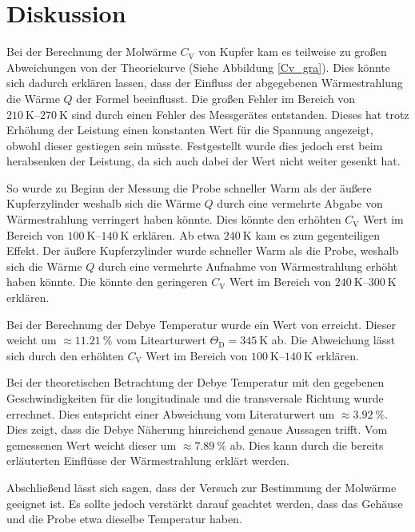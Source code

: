\section{Diskussion} %
\label{sec:diskussion}

Bei der Berechnung der Molwärme $C_\mathrm{V}$ von Kupfer kam es teilweise zu großen Abweichungen von der Theoriekurve (Siehe Abbildung \ref{Cv_gra}). 
Dies könnte sich dadurch erklären lassen, dass der Einfluss der abgegebenen Wärmestrahlung die Wärme $Q$ der Formel beeinflusst.
Die großen Fehler im Bereich von $\SIrange{210}{270}{\kelvin}$ sind durch einen Fehler des Messgerätes entstanden.
Dieses hat trotz Erhöhung der Leistung einen konstanten Wert für die Spannung angezeigt, obwohl dieser gestiegen sein müsste.
Festgestellt wurde dies jedoch erst beim herabsenken der Leistung, da sich auch dabei der Wert nicht weiter gesenkt hat.

So wurde zu Beginn der Messung die Probe schneller Warm als der äußere Kupferzylinder weshalb sich die Wärme $Q$ durch eine vermehrte Abgabe von Wärmestrahlung verringert haben könnte.
Dies könnte den erhöhten $C_\mathrm{V}$ Wert im Bereich von $\SIrange{100}{140}{\kelvin}$ erklären.
Ab etwa $\SI{240}{\kelvin}$ kam es zum gegenteiligen Effekt.
Der äußere Kupferzylinder wurde schneller Warm als die Probe, weshalb sich die Wärme $Q$ durch eine vermehrte Aufnahme von Wärmestrahlung erhöht haben könnte.
Die könnte den geringeren $C_\mathrm{V}$ Wert im Bereich von $\SIrange{240}{300}{\kelvin}$ erklären.

Bei der Berechnung der Debye Temperatur wurde ein Wert von  erreicht.
Dieser weicht um $\approx \SI{11.21}{\percent}$ vom Litearturwert $\Theta_\mathrm{D} = \SI{345}{\kelvin}$ \cite{kupfer3} ab.
Die Abweichung lässt sich durch den erhöhten $C_\mathrm{V}$ Wert im Bereich von $\SIrange{100}{140}{\kelvin}$ erklären.

Bei der theoretischen Betrachtung der Debye Temperatur mit den gegebenen Geschwindigkeiten für die longitudinale und die transversale Richtung wurde  errechnet.
Dies entspricht einer Abweichung vom Literaturwert um $\approx \SI{3.92}{\percent}$. 
Dies zeigt, dass die Debye Näherung hinreichend genaue Aussagen trifft.
Vom gemessenen Wert weicht dieser um $\approx \SI{7.89}{\percent}$ ab.
Dies kann durch die bereits erläuterten Einflüsse der Wärmestrahlung erklärt werden.

Abschließend lässt sich sagen, dass der Versuch zur Bestimmung der Molwärme geeignet ist.
Es sollte jedoch verstärkt darauf geachtet werden, dass das Gehäuse und die Probe etwa dieselbe Temperatur haben.